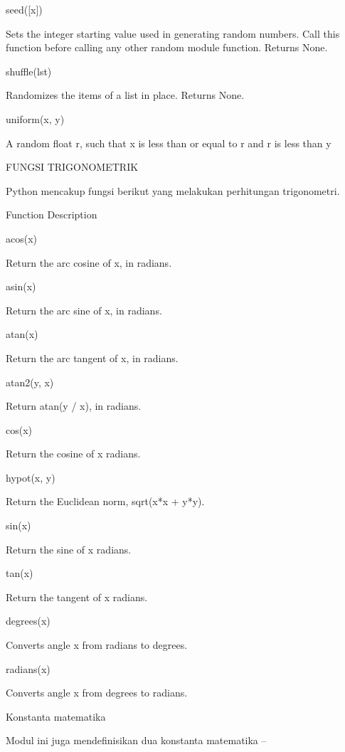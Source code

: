 seed([x])  \par
Sets the integer starting value used in generating random numbers. Call this function before calling any other random module function. Returns None. \par
shuffle(lst)  \par
Randomizes the items of a list in place. Returns None. \par
uniform(x, y) \par
A random float r, such that x is less than or equal to r and r is less than y  \par
FUNGSI TRIGONOMETRIK \par
Python mencakup fungsi berikut yang melakukan perhitungan trigonometri. \par
\vspace{12pt}
Function \hspace*{0.5in} Description \par
acos(x) \par
Return the arc cosine of x, in radians. \par
asin(x) \par
Return the arc sine of x, in radians. \par
atan(x) \par
Return the arc tangent of x, in radians. \par
atan2(y, x) \par
Return atan(y / x), in radians.  \par
cos(x) \par
Return the cosine of x radians. \par
hypot(x, y) \par
Return the Euclidean norm, sqrt(x*x + y*y).  \par
sin(x) \par
Return the sine of x radians. \par
tan(x) \par
Return the tangent of x radians. \par
degrees(x) \par
Converts angle x from radians to degrees. \par
radians(x) \par
Converts angle x from degrees to radians. \par
\vspace{12pt}
Konstanta matematika \par
\vspace{12pt}
Modul ini juga mendefinisikan dua konstanta matematika – \par
\vspace{12pt}
